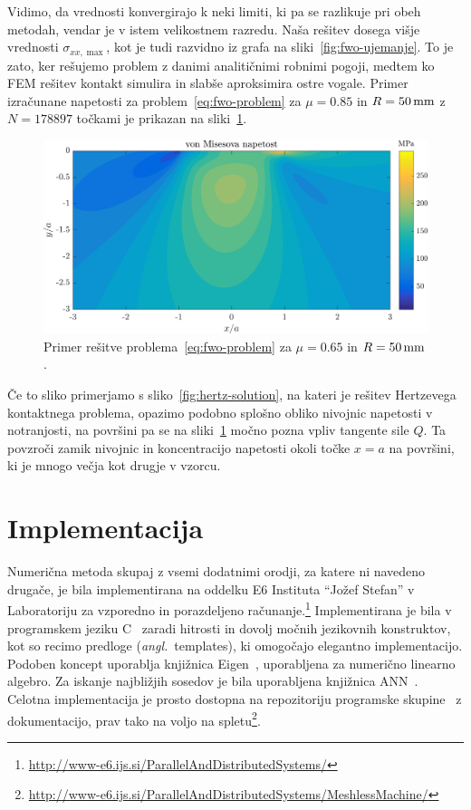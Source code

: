 \documentclass[12pt,a4paper,twoside]{article}
\theoremstyle{definition} %
\theoremstyle{plain} %
\numberwithin{equation}{section}
\newcommand{\ts}{\sigma}
\newcommand{\ang}[1]{(\hspace{-1.5px}\textit{angl.}\ #1)}
\newlength{\iw}
\let\oldsection\section
\def\section{\cleardoublepage\oldsection}
\newcommand{\CC}{C\nolinebreak\hspace{-.05em}\raisebox{.4ex}{\tiny\bf +}\nolinebreak\hspace{-.10em}\raisebox{.4ex}{\tiny\bf +}}
\begin{document}
Vidimo, da vrednosti konvergirajo k neki limiti, ki pa se razlikuje pri obeh metodah, vendar je v
istem velikostnem razredu. Naša rešitev dosega višje vrednosti $\ts_{xx, \max}$, kot je tudi
razvidno iz grafa na sliki~\ref{fig:fwo-ujemanje}. To je zato, ker rešujemo problem z danimi
analitičnimi robnimi pogoji, medtem ko FEM rešitev kontakt simulira in slabše aproksimira ostre
vogale. Primer izračunane napetosti za problem~\eqref{eq:fwo-problem} za $\mu=0.85$ in $R =
\unit[50]{mm}$ z $N = 178897$ točkami je prikazan na sliki~\ref{fig:fwo-solution}.

\begin{figure}[h]
  \centering
  \includegraphics[width=\iw]{images/fwo_solution.png}
  \caption{Primer rešitve problema~\eqref{eq:fwo-problem} za $\mu=0.65$ in $R = \unit[50]{mm}$.}
  \label{fig:fwo-solution}
\end{figure}

Če to sliko primerjamo s sliko~\ref{fig:hertz-solution}, na kateri je rešitev Hertzevega kontaktnega
problema, opazimo podobno splošno obliko nivojnic napetosti v notranjosti, na površini pa se na
sliki~\ref{fig:fwo-solution} močno pozna vpliv tangente sile $Q$. Ta povzroči zamik nivojnic in
koncentracijo napetosti okoli točke $x = a$ na površini, ki je mnogo večja kot drugje v vzorcu.

\section{Implementacija}
\label{sec:implementacija}
Numerična metoda skupaj z vsemi dodatnimi orodji, za katere ni navedeno drugače, je bila
implementirana na oddelku E6 Instituta ``Jožef Stefan'' v Laboratoriju za vzporedno in porazdeljeno
računanje.\footnote{\url{http://www-e6.ijs.si/ParallelAndDistributedSystems/}} Implementirana je
bila v programskem jeziku \CC~\cite{stroustrup1995c++} zaradi hitrosti in dovolj močnih jezikovnih
konstruktov, kot so recimo predloge \ang{templates}, ki omogočajo elegantno implementacijo. Podoben
koncept uporablja knjižnica Eigen~\cite{eigenweb}, uporabljena za numerično linearno algebro. Za
iskanje najbližjih sosedov je bila uporabljena knjižnica ANN~\cite{mount1998ann}. Celotna
implementacija je prosto dostopna na repozitoriju programske skupine~\cite{utils_web} z
dokumentacijo, prav tako na voljo na
spletu\footnote{\url{http://www-e6.ijs.si/ParallelAndDistributedSystems/MeshlessMachine/}}.
\end{document}

